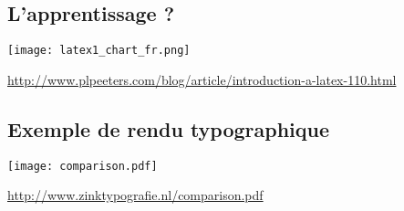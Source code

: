 \subsection{L'apprentissage ?}

\begin{frame}
	\centering \texttt{[image: latex1\_chart\_fr.png]}

	\url{http://www.plpeeters.com/blog/article/introduction-a-latex-110.html}
\end{frame}

\subsection{Exemple de rendu typographique}
\begin{frame}
  \centering
  \texttt{[image: comparison.pdf]}
  
  \url{http://www.zinktypografie.nl/comparison.pdf}
\end{frame}
